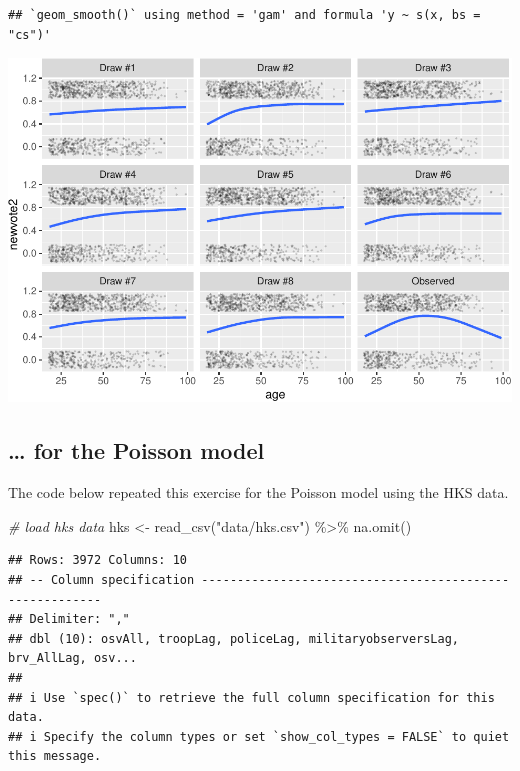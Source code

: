 \documentclass[
]{book}
\newenvironment{Shaded}{\begin{snugshade}}{\end{snugshade}}
\newcommand{\CommentTok}[1]{\textcolor[rgb]{0.56,0.35,0.01}{\textit{#1}}}
\newcommand{\FunctionTok}[1]{\textcolor[rgb]{0.00,0.00,0.00}{#1}}
\newcommand{\NormalTok}[1]{#1}
\newcommand{\OtherTok}[1]{\textcolor[rgb]{0.56,0.35,0.01}{#1}}
\newcommand{\SpecialCharTok}[1]{\textcolor[rgb]{0.00,0.00,0.00}{#1}}
\newcommand{\StringTok}[1]{\textcolor[rgb]{0.31,0.60,0.02}{#1}}
\begin{document}
\begin{verbatim}
## `geom_smooth()` using method = 'gam' and formula 'y ~ s(x, bs = "cs")'
\end{verbatim}

\includegraphics{03-04-predictive-distributions_files/figure-latex/unnamed-chunk-5-1.pdf}

\hypertarget{for-the-poisson-model}{%
\subsection{\ldots{} for the Poisson model}\label{for-the-poisson-model}}

The code below repeated this exercise for the Poisson model using the HKS data.

\begin{Shaded}
\begin{Highlighting}[]
\CommentTok{\# load hks data}
\NormalTok{hks }\OtherTok{\textless{}{-}} \FunctionTok{read\_csv}\NormalTok{(}\StringTok{"data/hks.csv"}\NormalTok{) }\SpecialCharTok{\%\textgreater{}\%}
  \FunctionTok{na.omit}\NormalTok{()}
\end{Highlighting}
\end{Shaded}

\begin{verbatim}
## Rows: 3972 Columns: 10
## -- Column specification --------------------------------------------------------
## Delimiter: ","
## dbl (10): osvAll, troopLag, policeLag, militaryobserversLag, brv_AllLag, osv...
## 
## i Use `spec()` to retrieve the full column specification for this data.
## i Specify the column types or set `show_col_types = FALSE` to quiet this message.
\end{verbatim}
\end{document}
